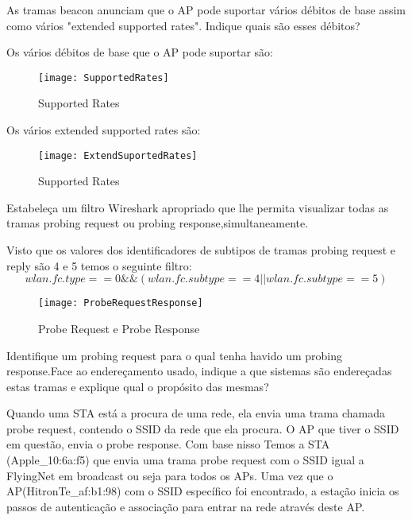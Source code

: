\documentclass{exam}
\begin{document}
\begin{questions}
\question As tramas beacon anunciam que o AP pode suportar vários débitos de base assim como vários "extended supported rates". Indique quais são esses débitos?
\begin{solution}
Os vários débitos de base que o AP pode suportar são:
\begin{figure}[H]
\centering\texttt{[image: SupportedRates]} 
\caption{\label{fig:controller}Supported Rates}
\end{figure}

Os vários extended supported rates são:
\begin{figure}[H]
\centering\texttt{[image: ExtendSuportedRates]} 
\caption{\label{fig:controller}Supported Rates}
\end{figure}

\end{solution}

\question Estabeleça um filtro Wireshark apropriado que lhe permita visualizar todas as tramas probing request ou probing response,simultaneamente.
\begin{solution}
Visto que os valores dos identificadores de subtipos de tramas probing  request e reply são 4 e 5 temos o seguinte filtro:
\begin{equation}
wlan.fc.type==0 \&\& ( wlan.fc.subtype==4 || wlan.fc.subtype==5)
\end{equation}
\end{solution}


\begin{figure}[H]
\centering\texttt{[image: ProbeRequestResponse]} 
\caption{\label{fig:controller}Probe Request e Probe Response}
\end{figure}



\question Identifique um probing request para o qual tenha havido um probing response.Face ao endereçamento usado, indique a que sistemas são endereçadas estas tramas e explique qual o propósito das mesmas?
\begin{solution}
Quando uma STA está a procura de uma rede, ela envia uma trama chamada probe request, contendo o SSID da rede que ela procura. O AP que tiver o
SSID em questão, envia o probe response. Com base nisso  Temos a STA (Apple\_10:6a:f5) que envia uma trama probe request com o SSID igual a FlyingNet em broadcast ou seja para todos os APs. Uma vez que o AP(HitronTe\_af:b1:98) com o SSID específico foi encontrado, a estação inicia os passos de autenticação e associação
para entrar na rede através deste AP.
\end{solution}


\end{questions}
\end{document}
